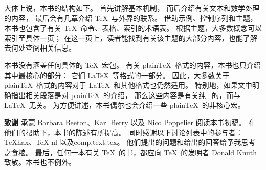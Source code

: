 \documentclass[letterpaper]{book}
\begin{document}
大体上说，本书的结构如下。
首先讲解基本机制，
而后介绍有关文本和数学处理的内容，
最后会有几章介绍 \TeX\ 与外界的联系。
%
借助示例、控制序列和主题，本书也包含了有关 \TeX\ 命令、表格、索引的术语表。
根据主题，大多数概念可以索引至具体一页；
在这一页上，读者能找到有关该主题的大部分内容，也能了解去何处查阅相关信息。

本书没有涵盖任何具体的 \TeX\ 宏包。
有关 plain\TeX\ 格式的内容，本书也只介绍其中最核心的部分：
它们 \LaTeX\ 等格式的一部分。
因此，大多数关于 plain\TeX\ 格式的内容对于 \LaTeX\ 和其他格式也仍然适用。
特别地，如果文中明确指出相关段落是对 plain\TeX\ 的介绍，
那么这些内容是有关纯 \IniTeX\ 的，而与 \LaTeX\ 无关。
为方便讲述，本书偶尔也会介绍一些 plain\TeX\ 的非核心宏。

\medskip\noindent
{\bfseries 致谢}\nl
承蒙 Barbara Beeton、Karl Berry 以及 Nico Poppelier 阅读本书初稿。
在他们的帮助下，本书的陈述有所提高。
同时感谢以下讨论列表中的参与者：\TeX hax、\TeX-nl 以及{\ttfamily comp.text.tex}。
他们提出的问题和给出的回答给予我思考之食粮。
最后，任何一本有关 \TeX\ 的书，都应向 \TeX\ 的发明者 Donald Knuth 致敬。本书也不例外。
\end{document}
